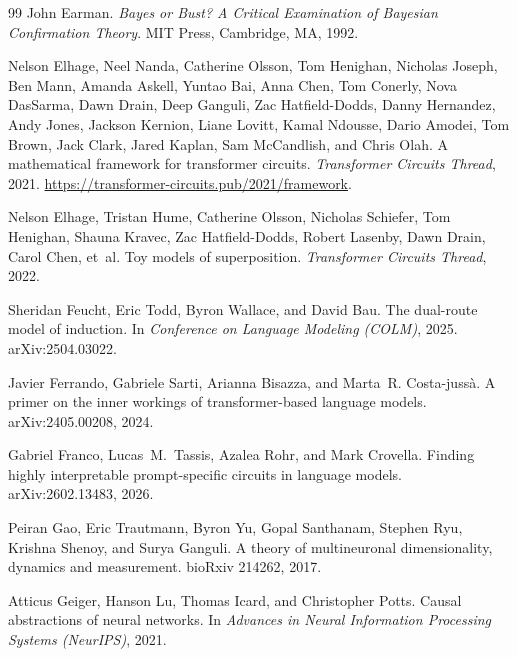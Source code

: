 \documentclass{article}
\begin{document}
\begin{thebibliography}{99}
John Earman.
\newblock \emph{Bayes or Bust? A Critical Examination of Bayesian Confirmation
  Theory}.
\newblock MIT Press, Cambridge, MA, 1992.

Nelson Elhage, Neel Nanda, Catherine Olsson, Tom Henighan, Nicholas Joseph,
  Ben Mann, Amanda Askell, Yuntao Bai, Anna Chen, Tom Conerly, Nova DasSarma,
  Dawn Drain, Deep Ganguli, Zac Hatfield-Dodds, Danny Hernandez, Andy Jones,
  Jackson Kernion, Liane Lovitt, Kamal Ndousse, Dario Amodei, Tom Brown, Jack
  Clark, Jared Kaplan, Sam McCandlish, and Chris Olah.
\newblock A mathematical framework for transformer circuits.
\newblock \emph{Transformer Circuits Thread}, 2021.
\newblock \url{https://transformer-circuits.pub/2021/framework}.

Nelson Elhage, Tristan Hume, Catherine Olsson, Nicholas Schiefer, Tom Henighan,
  Shauna Kravec, Zac Hatfield-Dodds, Robert Lasenby, Dawn Drain, Carol Chen,
  et~al.
\newblock Toy models of superposition.
\newblock \emph{Transformer Circuits Thread}, 2022.

Sheridan Feucht, Eric Todd, Byron Wallace, and David Bau.
\newblock The dual-route model of induction.
\newblock In \emph{Conference on Language Modeling (COLM)}, 2025.
\newblock arXiv:2504.03022.

Javier Ferrando, Gabriele Sarti, Arianna Bisazza, and Marta~R. Costa-juss\`a.
\newblock A primer on the inner workings of transformer-based language models.
\newblock arXiv:2405.00208, 2024.

Gabriel Franco, Lucas~M.\ Tassis, Azalea Rohr, and Mark Crovella.
\newblock Finding highly interpretable prompt-specific circuits in language
  models.
\newblock arXiv:2602.13483, 2026.

Peiran Gao, Eric Trautmann, Byron Yu, Gopal Santhanam, Stephen Ryu, Krishna
  Shenoy, and Surya Ganguli.
\newblock A theory of multineuronal dimensionality, dynamics and measurement.
\newblock bioRxiv 214262, 2017.

Atticus Geiger, Hanson Lu, Thomas Icard, and Christopher Potts.
\newblock Causal abstractions of neural networks.
\newblock In \emph{Advances in Neural Information Processing Systems
  (NeurIPS)}, 2021.


\end{thebibliography}
\end{document}
